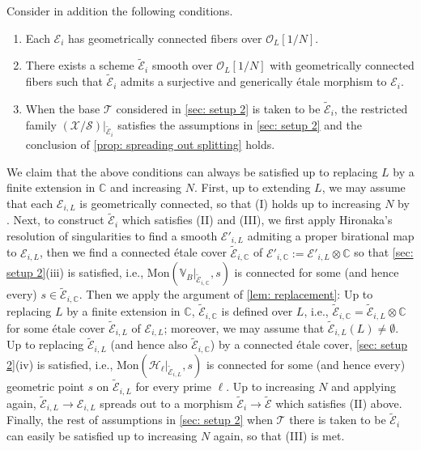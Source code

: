 \documentclass[letter, 11pt]{article}
\theoremstyle{plain}
\theoremstyle{definition}
\newcommand{\IC}{\mathbb{C}}
\newcommand{\IV}{\mathbb{V}}
\newcommand\tensor{{\otimes}}
\newcommand{\<}{\langle}
\renewcommand{\>}{\rangle}
\def\wt{\widetilde}
\newcommand{\sH}{\mathcal{H}}
\newcommand{\sX}{\mathcal{X}}
\newcommand{\sS}{\mathcal{S}}
\newcommand{\sT}{\mathcal{T}}
\newcommand{\sE}{\mathcal{E}}
\newcommand{\sO}{\mathcal{O}}
\newcommand{\Mon}{\mathrm{Mon}}
\begin{document}
\subsubsection{} \label{sec: setup 2+} Consider in addition the following conditions. 
\begin{enumerate}[label=\upshape{(\Roman*)}]
    \item Each $\sE_i$ has geometrically connected fibers over $\sO_L[1/N]$. 
    \item There exists a scheme $\wt{\sE}_i$ smooth over $\sO_L[1/N]$ with geometrically connected fibers such that $\wt{\sE}_i$ admits a surjective and generically \'etale morphism to $\sE_i$. 
    \item When the base $\sT$ considered in \ref{sec: setup 2} is taken to be $\wt{\sE}_i$, the restricted family $(\sX/\sS)|_{\wt{\sE}_i}$ satisfies the assumptions in \ref{sec: setup 2} and the conclusion of \ref{prop: spreading out splitting} holds.
\end{enumerate}

We claim that the above conditions can always be satisfied up to replacing $L$ by a finite extension in $\IC$ and increasing $N$. First, up to extending $L$, we may assume that each $\sE_{i, L}$ is geometrically connected, so that (I) holds up to increasing $N$ by \cite[055H]{stacks-project}. Next, to construct $\wt{\sE}_i$ which satisfies (II) and (III), we first apply Hironaka's resolution of singularities to find a smooth $\sE'_{i, L}$ admiting a proper birational map to $\sE_{i, L}$, then we find a connected \'etale cover $\wt{\sE}_{i, \IC}$ of $\sE'_{i, \IC} := \sE'_{i, L} \tensor \IC$ so that \ref{sec: setup 2}(iii) is satisfied, i.e., $\Mon(\IV_B|_{\wt{\sE}_{i, \IC}}, s)$ is connected for some (and hence every) $s \in \wt{\sE}_{i, \IC}$. Then we apply the argument of \ref{lem: replacement}: Up to replacing $L$ by a finite extension in $\IC$, $\wt{\sE}_{i, \IC}$ is defined over $L$, i.e., $\wt{\sE}_{i, \IC} = \wt{\sE}_{i, L} \tensor \IC$ for some \'etale cover $\wt{\sE}_{i, L}$ of $\sE_{i, L}$; moreover, we may assume that $\wt{\sE}_{i, L}(L) \neq \emptyset$. Up to replacing $\wt{\sE}_{i, L}$ (and hence also $\wt{\sE}_{i, \IC}$) by a connected \'etale cover, \ref{sec: setup 2}(iv) is satisfied, i.e., $\Mon(\sH_\ell|_{\wt{\sE}_{i, L}}, s)$ is connected for some (and hence every) geometric point $s$ on $\wt{\sE}_{i, L}$ for every prime $\ell$. Up to increasing $N$ and applying \cite[055H]{stacks-project} again, $\wt{\sE}_{i, L} \to \sE_{i, L}$ spreads out to a morphism $\wt{\sE}_i \to \wt{\sE}$ which satisfies (II) above. Finally, the rest of assumptions in \ref{sec: setup 2} when $\sT$ there is taken to be $\wt{\sE}_i$ can easily be satisfied up to increasing $N$ again, so that (III) is met. 
\end{document}
